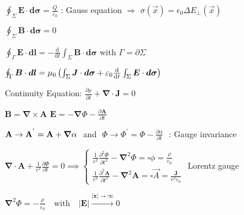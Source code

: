 \item $ \oint_{\Sigma}\boldsymbol{E} \cdot \boldsymbol{d\sigma} = \frac{Q}{\varepsilon_0}$ : Gauss equation
$\Longrightarrow$ \squishsep $\sigma(\vec{x}) = \epsilon_0 \Delta E_{\perp}(\vec{x})$

\item $ \oint_{\Sigma}\boldsymbol{B} \cdot \boldsymbol{d\sigma} = 0$

\item $ \oint_{\Gamma} \boldsymbol{E} \cdot \boldsymbol{dl} = -\frac{\text{d}}{\text{d}t}\int_{\Sigma} \boldsymbol{B} \cdot \boldsymbol{d\sigma}$ with $\Gamma=\partial\Sigma$

\item $ \oint_{\Gamma} \boldsymbol{B} \cdot \boldsymbol{dl} = \mu_0 \left(\int_{\Sigma} \boldsymbol{J} \cdot \boldsymbol{d\sigma} + \varepsilon_0 \frac{\ud }{\ud t}\int_{\Sigma} \boldsymbol{E} \cdot \boldsymbol{d\sigma}\right)$ 

\item Continuity Equation: $\frac{\partial \rho}{\partial t} + \boldsymbol{\nabla}\cdot\boldsymbol{J} = 0$
\squishend

\squishlist
\item $\boldsymbol{B} = \boldsymbol{\nabla} \times \boldsymbol{A}$ \squishsep $\boldsymbol{E} = -\boldsymbol{\nabla} \Phi - \frac{\partial \boldsymbol{A}}{\partial t}$

\item $\vec{\rm{A}} \rightarrow \vec{\rm{A}}^{'} = \vec{\rm{A}} + \vec{\nabla}\alpha \,\,$  and  $\,\, \Phi \rightarrow \Phi^{'} = \Phi - \frac{\partial\alpha}{\partial t} \,\,$ : Gauge invariance 

\item $\boldsymbol{\nabla} \cdot \boldsymbol{A} + \frac{1}{c^2}\frac{\partial \Phi}{\partial t}=0\implies
\begin{cases}
	\frac{1}{c^2}\frac{\partial^2 \Phi }{\partial t^2} - \boldsymbol{\nabla}^2 \Phi = \square \phi = \frac{\rho}{\varepsilon_0} \\
	\frac{1}{c^2}\frac{\partial^2 \boldsymbol{A}}{\partial t^2} - \boldsymbol{\nabla}^2 \boldsymbol{A} = \square \vec{A} =  \frac{\boldsymbol{J}}{c^2\varepsilon_0}
\end{cases}$ Lorentz gauge
\squishend


\squishlist
\item $\boldsymbol{\nabla}^2\Phi = -\frac{\rho}{\varepsilon_0} \quad \text{with} \quad |\boldsymbol{E}| \overset{|\boldsymbol{x}|\to \infty}{\longrightarrow} 0$

